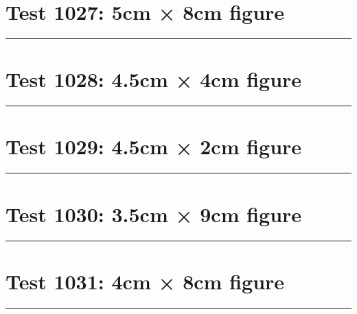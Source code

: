 \documentclass[a4paper,11pt]{article}
\begin{document}
\section*{Test 1027: 5cm × 8cm figure}
\begin{swarmwrap}%
  \begin{minipage}[t]{5cm}
    \centering
    \rule{\linewidth}{8cm}
  \end{minipage}%
\end{swarmwrap}%
\swarmwrapnext
\lipsum[109]
\lipsum[110]
\lipsum[111]
\lipsum[112]
\lipsum[113]
\lipsum[114]
\section*{Test 1028: 4.5cm × 4cm figure}
\begin{swarmwrap}%
  \begin{minipage}[t]{4cm}
    \centering
    \rule{\linewidth}{4cm}
  \end{minipage}%
\end{swarmwrap}%
\swarmwrapnext
\lipsum[35]
\lipsum[36]
\lipsum[37]
\section*{Test 1029: 4.5cm × 2cm figure}
\begin{swarmwrap}%
  \begin{minipage}[t]{4cm}
    \centering
    \rule{\linewidth}{2cm}
  \end{minipage}%
\end{swarmwrap}%
\swarmwrapnext
\lipsum[28]
\lipsum[29]
\lipsum[30]
\lipsum[31]
\section*{Test 1030: 3.5cm × 9cm figure}
\begin{swarmwrap}%
  \begin{minipage}[t]{3cm}
    \centering
    \rule{\linewidth}{9cm}
  \end{minipage}%
\end{swarmwrap}%
\swarmwrapnext
\lipsum[48]
\lipsum[49]
\lipsum[50]
\lipsum[51]
\lipsum[52]
\lipsum[53]
\section*{Test 1031: 4cm × 8cm figure}
\begin{swarmwrap}%
  \begin{minipage}[t]{4cm}
    \centering
    \rule{\linewidth}{8cm}
  \end{minipage}%
\end{swarmwrap}%
\swarmwrapnext
\lipsum[9]
\lipsum[10]
\lipsum[11]
\lipsum[12]
\lipsum[13]
\end{document}
